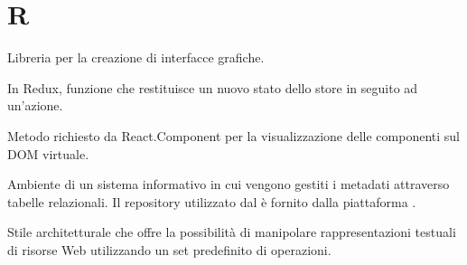 \section{R}

Libreria  per la creazione di interfacce grafiche.

	In Redux, funzione che restituisce un nuovo stato dello store in seguito ad un'azione.

	Metodo richiesto da React.Component per la visualizzazione delle componenti sul DOM virtuale.

Ambiente di un sistema informativo in cui vengono gestiti i metadati attraverso
tabelle relazionali. Il repository utilizzato dal  \zephyrus{} è fornito
dalla piattaforma .

Stile architetturale che offre la possibilità di manipolare rappresentazioni testuali di risorse Web utilizzando un set predefinito di operazioni.
